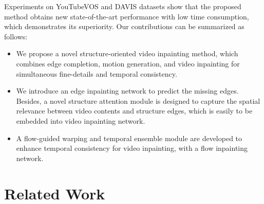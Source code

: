 %
Experiments on YouTubeVOS and DAVIS datasets show that the proposed method obtains new state-of-the-art performance with low time consumption, which demonstrates its superiority.
%
Our contributions can be summarized as follows:
\begin{itemize}
	\item We propose a novel structure-oriented video inpainting method, which combines edge completion, motion generation, and video inpainting for simultaneous fine-details and temporal consistency.
	\item We introduce an edge inpainting network to predict the missing edges. Besides, a novel structure attention module is designed to capture the spatial relevance between video contents and structure edges, which is easily to be embedded into video inpainting network. %
	\item A flow-guided warping and temporal ensemble module are developed to enhance temporal consistency for video inpainting, with a flow inpainting network.
	
	
	
\end{itemize}





\section{Related Work}
